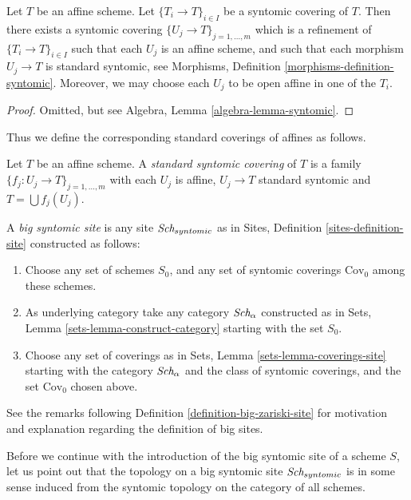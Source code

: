 \begin{lemma}
\label{lemma-syntomic-affine}
Let $T$ be an affine scheme.
Let $\{T_i \to T\}_{i \in I}$ be a syntomic covering of $T$.
Then there exists a syntomic covering
$\{U_j \to T\}_{j = 1, \ldots, m}$ which is a refinement
of $\{T_i \to T\}_{i \in I}$ such that each $U_j$ is an affine
scheme, and such that each morphism $U_j \to T$ is standard
syntomic, see Morphisms, Definition \ref{morphisms-definition-syntomic}.
Moreover, we may choose each $U_j$ to be open affine in one of the $T_i$.
\end{lemma}

\begin{proof}
Omitted, but see Algebra, Lemma \ref{algebra-lemma-syntomic}.
\end{proof}

\noindent
Thus we define the corresponding standard coverings of affines as follows.

\begin{definition}
\label{definition-standard-syntomic}
Let $T$ be an affine scheme. A {\it standard syntomic covering} of $T$ is
a family $\{f_j : U_j \to T\}_{j = 1, \ldots, m}$ with each $U_j$ is
affine, $U_j \to T$ standard syntomic and $T = \bigcup f_j(U_j)$.
\end{definition}

\begin{definition}
\label{definition-big-syntomic-site}
A {\it big syntomic site} is any site $\textit{Sch}_{syntomic}$ as in
Sites, Definition \ref{sites-definition-site} constructed as follows:
\begin{enumerate}
\item Choose any set of schemes $S_0$, and any set of syntomic coverings
$\text{Cov}_0$ among these schemes.
\item As underlying category take any category $\textit{Sch}_\alpha$
constructed as in Sets, Lemma \ref{sets-lemma-construct-category}
starting with the set $S_0$.
\item Choose any set of coverings as in
Sets, Lemma \ref{sets-lemma-coverings-site} starting with the
category $\textit{Sch}_\alpha$ and the class of syntomic coverings,
and the set $\text{Cov}_0$ chosen above.
\end{enumerate}
\end{definition}

\noindent
See the remarks following Definition \ref{definition-big-zariski-site}
for motivation and explanation regarding the definition of big sites.

\medskip\noindent
Before we continue with the introduction of the big syntomic site of
a scheme $S$, let us point out that the topology on a big syntomic site
$\textit{Sch}_{syntomic}$ is in some sense induced from the syntomic topology
on the category of all schemes.

